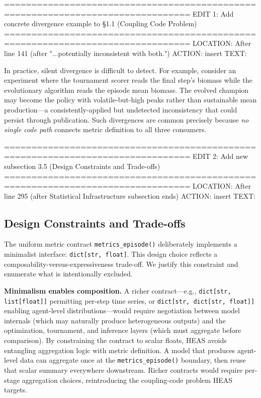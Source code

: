 %

================================================================================
EDIT 1: Add concrete divergence example to §1.1 (Coupling Code Problem)
================================================================================
LOCATION: After line 141 (after "...potentially inconsistent with both.")
ACTION: insert
TEXT:

In practice, silent divergence is difficult to detect. For example, consider an
experiment where the tournament scorer reads the final step's biomass while the
evolutionary algorithm reads the episode mean biomass. The evolved champion may
become the policy with volatile-but-high peaks rather than sustainable mean
production---a consistently-applied but undetected inconsistency that could
persist through publication. Such divergences are common precisely because
\emph{no single code path} connects metric definition to all three consumers.

================================================================================
EDIT 2: Add new subsection 3.5 (Design Constraints and Trade-offs)
================================================================================
LOCATION: After line 295 (after Statistical Infrastructure subsection ends)
ACTION: insert
TEXT:

\subsection{Design Constraints and Trade-offs}
\label{sec:design-constraints}

The uniform metric contract \texttt{metrics\_episode()} deliberately implements
a minimalist interface: \texttt{dict[str, float]}. This design choice reflects a
composability-versus-expressiveness trade-off. We justify this constraint and
enumerate what is intentionally excluded.

\textbf{Minimalism enables composition.} A richer contract---e.g.,
\texttt{dict[str, list[float]]} permitting per-step time series, or
\texttt{dict[str, dict[str, float]]} enabling agent-level distributions---would
require negotiation between model internals (which may naturally produce
heterogeneous outputs) and the optimization, tournament, and inference layers
(which must aggregate before comparison). By constraining the contract to scalar
floats, HEAS avoids entangling aggregation logic with metric definition. A model
that produces agent-level data can aggregate once at the \texttt{metrics\_episode()}
boundary, then reuse that scalar summary everywhere downstream. Richer contracts
would require per-stage aggregation choices, reintroducing the coupling-code
problem HEAS targets.

